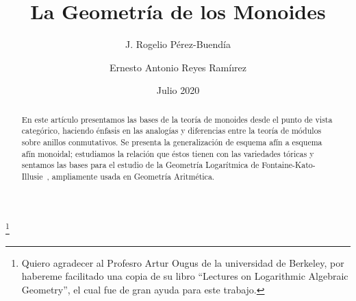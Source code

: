 \documentclass[12pt,spanish]{amsart}
\theoremstyle{definition}
\theoremstyle{remark}
\begin{document}


\author{J. Rogelio Pérez-Buendía}
\thanks{Quiero agradecer al Profesro Artur Ougus de la universidad de Berkeley, por habereme facilitado una copia de su libro ``Lectures on Logarithmic Algebraic Geometry'', el cual fue de gran ayuda para este trabajo.}
\address{CONACYT-CIMAT Mérida}

\author{Ernesto Antonio Reyes Ramíırez}
\address{DEMAT-Universidad de Guanajuato}
\title{La Geometría de los Monoides}


\date{Julio 2020}
\maketitle
\begin{abstract}
    En este artículo  presentamos las bases de la teoría de monoides desde el punto de vista categórico, haciendo énfasis en las analogías y diferencias entre la teoría de módulos sobre anillos conmutativos. Se presenta la generalización de esquema afín a esquema afín monoidal; estudiamos la relación que éstos tienen con las variedades tóricas y sentamos las bases para el estudio de la Geometría Logarítmica de Fontaine-Kato-Illusie~\cite{kato1989logarithmic}, ampliamente usada en Geometría Aritmética. 
\end{abstract}
\tableofcontents
\end{document}
